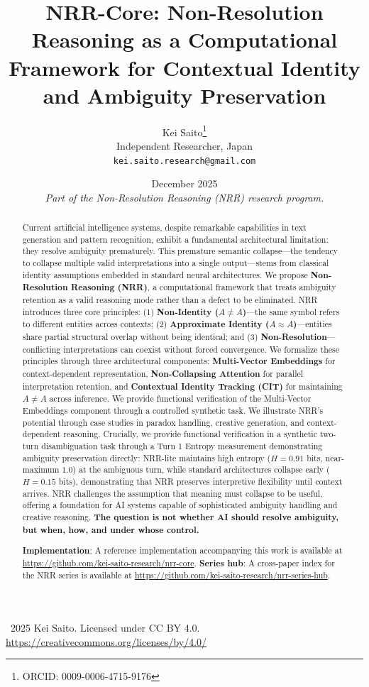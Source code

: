 \documentclass[11pt,a4paper]{article}
\title{\textbf{NRR-Core: Non-Resolution Reasoning as a Computational Framework for Contextual Identity and Ambiguity Preservation}}
\author{
  Kei Saito\thanks{ORCID: 0009-0006-4715-9176} \\
  Independent Researcher, Japan \\
  \texttt{kei.saito.research@gmail.com}
}
\date{December 2025 \\[0.5em]
\textit{Part of the Non-Resolution Reasoning (NRR) research program.}}
\begin{document}
\maketitle

\begin{center}
\textcopyright\ 2025 Kei Saito.
Licensed under CC BY 4.0.\\
\url{https://creativecommons.org/licenses/by/4.0/}
\end{center}

\begin{abstract}
Current artificial intelligence systems, despite remarkable capabilities in text generation and pattern recognition, exhibit a fundamental architectural limitation: they resolve ambiguity prematurely.
This premature semantic collapse---the tendency to collapse multiple valid interpretations into a single output---stems from classical identity assumptions embedded in standard neural architectures.
We propose \textbf{Non-Resolution Reasoning (NRR)}, a computational framework that treats ambiguity retention as a valid reasoning mode rather than a defect to be eliminated.
NRR introduces three core principles: (1) \textbf{Non-Identity ($A \neq A$)}---the same symbol refers to different entities across contexts;
(2) \textbf{Approximate Identity ($A \approx A$)}---entities share partial structural overlap without being identical;
and (3) \textbf{Non-Resolution}---conflicting interpretations can coexist without forced convergence.
We formalize these principles through three architectural components: \textbf{Multi-Vector Embeddings} for context-dependent representation, \textbf{Non-Collapsing Attention} for parallel interpretation retention, and \textbf{Contextual Identity Tracking (CIT)} for maintaining $A \neq A$ across inference.
We provide functional verification of the Multi-Vector Embeddings component through a controlled synthetic task.
We illustrate NRR's potential through case studies in paradox handling, creative generation, and context-dependent reasoning.
Crucially, we provide functional verification in a synthetic two-turn disambiguation task through a Turn 1 Entropy measurement demonstrating ambiguity preservation directly: NRR-lite maintains high entropy ($H = 0.91$ bits, near-maximum $1.0$) at the ambiguous turn, while standard architectures collapse early ($H = 0.15$ bits), demonstrating that NRR preserves interpretive flexibility until context arrives.
NRR challenges the assumption that meaning must collapse to be useful, offering a foundation for AI systems capable of sophisticated ambiguity handling and creative reasoning.
\textbf{The question is not whether AI should resolve ambiguity, but when, how, and under whose control.}

\textbf{Implementation}: A reference implementation accompanying this work 
is available at \url{https://github.com/kei-saito-research/nrr-core}.
\textbf{Series hub}: A cross-paper index for the NRR series is available at
\url{https://github.com/kei-saito-research/nrr-series-hub}.
\end{abstract}
\end{document}
